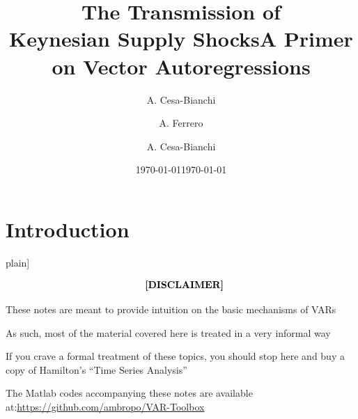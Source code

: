 \title[]{The Transmission of \\
Keynesian Supply Shocks}
\author[]{A. Cesa-Bianchi \and A. Ferrero \and A.
Cesa-Bianchi}
\date{\today }
\title[VAR models]{\textbf{A Primer on Vector Autoregressions}}
\date{\today }


\section{Introduction}

\begin{frame}
\lbrack plain] 
\titlepage{
\begin{center}
\color{note}{\scriptsize *The views expressed in this paper are those of the author(s) and do not necessarily represent \newline the views of the Bank of England or its committees.}
\end{center}}
\end{frame}


\begin{frame}
\bigskip 
\begin{equation*}
\text{\textbf{[DISCLAIMER]}}
\end{equation*}

\bigskip \bigskip

\centering
\begin{minipage}{.8\textwidth}
These notes are meant to provide intuition on the basic mechanisms of
VARs\bigskip

As such, most of the material covered here is treated in a very informal
way\bigskip

If you crave a formal treatment of these topics, you should stop here and
buy a copy of Hamilton's \textquotedblleft Time Series
Analysis\textquotedblright\bigskip

The Matlab codes accompanying these notes are available at:\newline \url{https://github.com/ambropo/VAR-Toolbox}
\end{minipage}
\end{frame}


